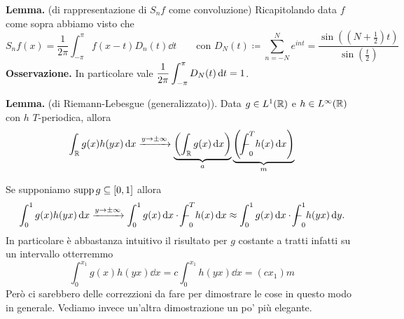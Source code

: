%
%




\textbf{Lemma.} (di rappresentazione di $S_n f$ come convoluzione)
Ricapitolando data $f$ come sopra abbiamo visto che
$$
S_n f(x) = \frac{1}{2\pi} \int_{-\pi}^\pi f(x - t) D_n(t) \dd t
\qquad
\text{con }
D_N(t) \coloneqq \sum_{n=-N}^N e^{int} = \frac{\sin\left(\left(N + \frac{1}{2}\right)t\right)}{\sin \left(\frac{t}{2}\right)}
$$
\textbf{Osservazione.}
In particolare vale $\displaystyle \frac{1}{2\pi} \int_{-\pi}^\pi D_N(t) \,\mathrm{d} t = 1$.

\textbf{Lemma.} (di Riemann-Lebesgue (generalizzato)).
Data $g \in L^1(\mathbb R)$ e $h \in L^\infty(\mathbb R)$ con $h$ $T$-periodica, allora
$$
\int_\R g(x) h(yx) \dd x \xrightarrow{y \to \pm \infty}
\underbrace{\left(\int_\R g(x) \dd x \right)}_a
\underbrace{\left(\avint_0^T h(x) \dd x \right)}_m
$$

Se supponiamo $\operatorname{supp} g \subseteq [0, 1]$ allora
%
$$
	 \int_0^1 g(x) h(yx) \dd x \xrightarrow{y \to \pm \infty} \int_0^1 g(x) \dd x \cdot \avint_0^T h(x) \dd x \approx \int_0^1 g(x) \dd x \cdot \avint_0^1 h(yx) \dd y.
$$
%
In particolare è abbastanza intuitivo il risultato per $g$ costante a tratti infatti su un intervallo otterremmo
$$
\int_0^{x_1} g(x) h(yx) \dd x = c \int_0^{x_1} h(yx) \dd x = (c x_1) m
$$
Però ci sarebbero delle correzzioni da fare per dimostrare le cose in questo modo in generale. Vediamo invece un'altra dimostrazione un po' più elegante.

